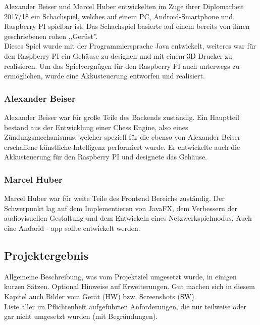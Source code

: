 \documentclass[12pt,a4paper]{article}
\newcommand{\cmnt}[1]{}			%
\newcommand{\yhbu}[0]{\color{ydkbu}}	%
\begin{document}
{	Alexander Beiser und Marcel Huber entwickelten im Zuge ihrer Diplomarbeit 2017/18 ein Schachspiel, welches auf einem PC, Android-Smartphone und Raspberry PI spielbar ist. Das Schachspiel basierte auf einem bereits von ihnen geschriebenen rohen ,,Gerüst''. \\
	Dieses Spiel wurde mit der Programmiersprache Java entwickelt, weiteres war für den Raspberry PI ein Gehäuse zu designen und mit einem 3D Drucker zu realisieren. Um das Spielvergnügen für den Raspberry PI auch unterwegs zu ermöglichen, wurde eine Akkusteuerung entworfen und realisiert. \\
	\subsubsection{Alexander Beiser}
	Alexander Beiser war für große Teile des Backends zuständig. Ein Hauptteil bestand aus der Entwicklung einer Chess Engine, also eines Zündungsmechanismus, welcher speziell für die ebenso von Alexander Beiser erschaffene künstliche Intelligenz performiert wurde. Er entwickelte auch die Akkusteuerung für den Raspberry PI und designete das Gehäuse.
	
	\subsubsection{Marcel Huber}
	Marcel Huber war für weite Teile des Frontend Bereichs zuständig. Der Schwerpunkt lag auf dem Implementieren von JavaFX, dem Verbessern der audiovisuellen Gestaltung und dem Entwickeln eines Netzwerkspielmodus. Auch eine Andorid - app sollte entwickelt werden.
 
	\vfill
	\newpage	
	
 \subsection{Projektergebnis}
	{\yhbu
	Allgemeine Beschreibung, was vom Projektziel umgesetzt wurde, in einigen kurzen Sätzen.
	Optional Hinweise auf Erweiterungen.
	Gut machen sich in diesem Kapitel auch Bilder vom Gerät (HW) bzw. Screenshots (SW).
	\\[1mm]
	Liste aller im Pflichtenheft aufgeführten Anforderungen,
	die nur teilweise oder gar nicht umgesetzt wurden (mit Begründungen).
	}










\clearpage\vfill\newpage
\cmnt{	
	\vspace*{-10mm}\noindent%
	{\Large\bf Inhaltsverzeichnis}\\
 \renewcommand{\theenumii}{\arabic{enumii}}
 \renewcommand{\labelenumii}{\theenumi.\theenumii}
 \renewcommand{\theenumiii}{\arabic{enumiii}}
 \renewcommand{\labelenumiii}{\theenumi.\theenumii.\theenumiii}

}}
\end{document}
